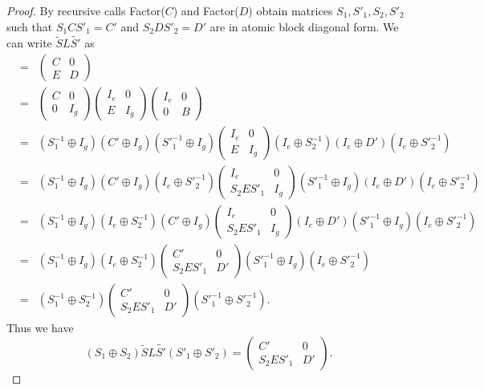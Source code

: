 \begin{proof}
By recursive calls Factor($C$) and Factor($D$) obtain matrices $S_1,
S'_1, S_2, S'_2$ such that $S_1C S'_1=C'$ and $S_2 D S'_2=D'$ are in
atomic block diagonal form.  We can write $\tilde{S}L\tilde{S'}$ as
\begin{eqnarray*}
&=& \left(
\begin{array}{cc}
C & 0 \\
E & D
\end{array}
\right)\\
&=& \left(
\begin{array}{cc}
C & 0 \\
0 & I_g
\end{array}
\right)\left(
\begin{array}{cc}
I_e & 0 \\
E & I_g
\end{array}
\right)\left(
\begin{array}{cc}
I_e & 0 \\
0 & B
\end{array}
\right)\\
&=& (S_1^{-1} \oplus I_g)(C' \oplus I_g)({S'}_1^{-1} \oplus I_g)\left(
\begin{array}{cc}
I_e & 0 \\
E & I_g
\end{array}
\right)(I_e \oplus S_2^{-1})(I_e \oplus D')(I_e \oplus {S'}_2^{-1})\\
&=&  (S_1^{-1} \oplus I_g)(C' \oplus I_g)(I_e \oplus {S'}_2^{-1})\left(
\begin{array}{cc}
I_e & 0 \\
S_2ES'_1 & I_g
\end{array}
\right)({S'}_1^{-1}\oplus I_g)(I_e \oplus D')(I_e \oplus {S'}_2^{-1})\\
&=& (S_1^{-1} \oplus I_g)(I_e \oplus S_2^{-1})(C' \oplus I_g)\left(
\begin{array}{cc}
I_e & 0 \\
S_2ES'_1 & I_g
\end{array}
\right)(I_e \oplus D')({S'}_1^{-1}\oplus I_g)(I_e \oplus {S'}_2^{-1})\\
&=& (S_1^{-1} \oplus I_g)(I_e \oplus S_2^{-1})\left(
\begin{array}{cc}
C' & 0 \\
S_2ES'_1 & D'
\end{array}
\right)({S'}_1^{-1}\oplus I_g)(I_e \oplus {S'}_2^{-1})\\
&=& (S_1^{-1} \oplus S_2^{-1})\left(
\begin{array}{cc}
C' & 0 \\
S_2ES'_1 & D'
\end{array}
\right)({S'}_1^{-1}\oplus {S'}_2^{-1}).
\end{eqnarray*}
Thus we have
\[
(S_1 \oplus S_2) \tilde{S}L\tilde{S'}(S'_1 \oplus S'_2) = \left(
\begin{array}{cc}
C' & 0 \\
S_2ES'_1 & D'
\end{array}
\right).
\]


\end{proof}
